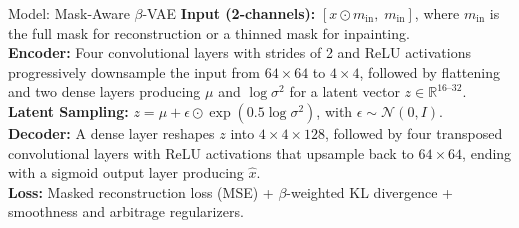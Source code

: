 \documentclass[11pt,aspectratio=169]{beamer}
\begin{document}
\begin{frame}{Model: Mask-Aware $\beta$-VAE}
    \textbf{Input (2-channels):} $[x\odot m_{\text{in}},\; m_{\text{in}}]$, where $m_{\text{in}}$ is the full mask for reconstruction or a thinned mask for inpainting.\\[6pt]

    \textbf{Encoder:} Four convolutional layers with strides of 2 and ReLU activations progressively downsample the input from $64{\times}64$ to $4{\times}4$, followed by flattening and two dense layers producing $\mu$ and $\log\sigma^2$ for a latent vector $z \in \mathbb{R}^{16\text{--}32}$.\\[6pt]

    \textbf{Latent Sampling:} $z = \mu + \epsilon \odot \exp(0.5 \log\sigma^2)$, with $\epsilon \sim \mathcal{N}(0, I)$.\\[6pt]

    \textbf{Decoder:} A dense layer reshapes $z$ into $4{\times}4{\times}128$, followed by four transposed convolutional layers with ReLU activations that upsample back to $64{\times}64$, ending with a sigmoid output layer producing $\hat{x}$.\\[6pt]

    \textbf{Loss:} Masked reconstruction loss (MSE) + $\beta$-weighted KL divergence + smoothness and arbitrage regularizers.
\end{frame}
\end{document}
